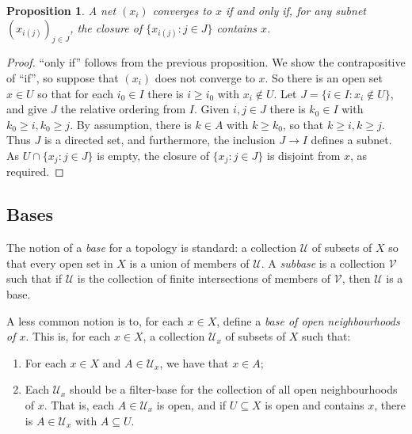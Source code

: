 \documentclass[a4paper,11pt]{article}
\newcommand{\mc}[1]{{\mathcal{#1}}}
\newtheorem{proposition}[lemma]{Proposition}
\begin{document}
\begin{proposition}
A net $(x_i)$ converges to $x$ if and only if, for any subnet
$(x_{i(j)})_{j\in J}$, the closure of $\{ x_{i(j)} : j\in J \}$ contains $x$.
\end{proposition}
\begin{proof}
``only if'' follows from the previous proposition.  We show the contrapositive
of ``if'', so suppose that $(x_i)$ does not converge to $x$.  So there is an
open set $x\in U$ so that for each $i_0\in I$ there is $i\geq i_0$ with $x_i
\not\in U$.  Let $J = \{ i\in I : x_i\not\in U \}$, and give $J$ the relative
ordering from $I$.  Given $i,j\in J$ there is $k_0\in I$ with $k_0\geq i,
k_0\geq j$.  By assumption, there is $k\in A$ with $k\geq k_0$, so that $k\geq i,
k\geq j$.  Thus $J$ is a directed set, and furthermore, the inclusion
$J\rightarrow I$ defines a subnet.  As $U \cap \{ x_j : j\in J \}$ is empty,
the closure of $\{ x_j : j\in J \}$ is disjoint from $x$, as required.
\end{proof}

\subsection{Bases}

The notion of a \emph{base} for a topology is standard: a collection $\mc U$ of
subsets of $X$ so that every open set in $X$ is a union of members of $\mc U$.
A \emph{subbase} is a collection $\mc V$ such that if $\mc U$ is the collection
of finite intersections of members of $\mc V$, then $\mc U$ is a base.

A less common notion is to, for each $x\in X$, define a \emph{base of open
neighbourhoods of $x$}.  This is, for each $x\in X$, a collection $\mc U_x$ of
subsets of $X$ such that:
\begin{enumerate}
\item\label{defn:bon:one}
For each $x\in X$ and $A\in\mc U_x$, we have that $x\in A$;
\item\label{defn:bon:two}
Each $\mc U_x$ should be a filter-base for the collection of all open
neighbourhoods of $x$.  That is, each $A\in\mc U_x$ is open, 
and if $U\subseteq X$ is open and contains $x$,
there is $A\in \mc U_x$ with $A\subseteq U$.
\end{enumerate}
\end{document}
